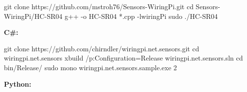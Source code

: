 \begin{console}
	git clone https://github.com/mstroh76/Sensors-WiringPi.git
	cd Sensors-WiringPi/HC-SR04	
	g++ -o HC-SR04 *.cpp -lwiringPi	
	sudo ./HC-SR04
\end{console}

\textbf{C\#:}

\begin{console}
	git clone https://github.com/chirndler/wiringpi.net.sensors.git
	cd wiringpi.net.sensors
	xbuild /p:Configuration=Release wiringpi.net.sensors.sln
	cd bin/Release/
	sudo mono wiringpi.net.sensors.sample.exe 2
\end{console}

\textbf{Python:}

\lstset{language=Python, caption=, 
        label=HCSR04Program, frame=single, basicstyle=\ttfamily
	      \footnotesize, breakatwhitespace=false, showstringspaces=false, 
        showtabs=false, tabsize=2 }


